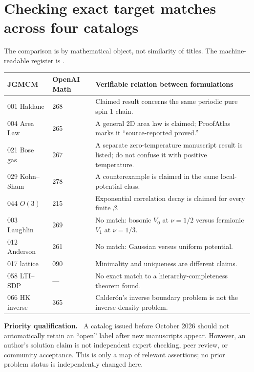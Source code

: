 \documentclass[11pt,a4paper,oneside]{book}
\newcommand{\note}[1]{\par\medskip\noindent\textbf{#1}\ }
\begin{document}
\section{Checking exact target matches across four catalogs}
The comparison is by mathematical object, not similarity of titles. The machine-readable register is .
\begin{longtable}{p{}p{}p{}}
\toprule JGMCM&OpenAI Math&Verifiable relation between formulations\\\midrule
001 Haldane&268&Claimed result concerns the same periodic pure spin-1 chain.\\
004 Area Law&265&A general 2D area law is claimed; ProofAtlas marks it ``source-reported proved.''\\
021 Bose gas&267&A separate zero-temperature manuscript result is listed; do not confuse it with positive temperature.\\
029 Kohn--Sham&278&A counterexample is claimed in the same local-potential class.\\
044 $O(3)$&215&Exponential correlation decay is claimed for every finite $\beta$.\\
003 Laughlin&269&No match: bosonic $V_0$ at $\nu=1/2$ versus fermionic $V_1$ at $\nu=1/3$.\\
012 Anderson&261&No match: Gaussian versus uniform potential.\\
017 lattice&090&Minimality and uniqueness are different claims.\\
058 LTI--SDP&---&No exact match to a hierarchy-completeness theorem found.\\
066 HK inverse&365&Calder\'on's inverse boundary problem is not the inverse-density problem.\\\bottomrule
\end{longtable}
\note{Priority qualification.} A catalog issued before October 2026 should not automatically retain an ``open'' label after new manuscripts appear. However, an author's solution claim is not independent expert checking, peer review, or community acceptance. This is only a map of relevant assertions; no prior problem status is independently changed here.
\end{document}
